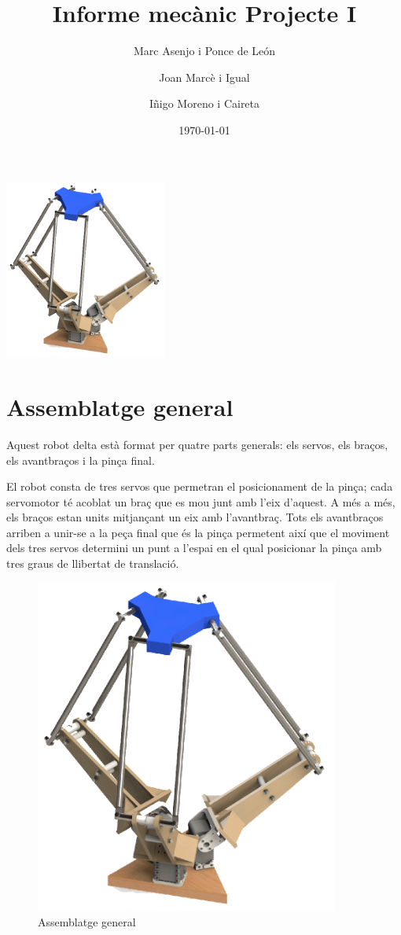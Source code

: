 \documentclass[a4paper, 12pt]{article}
\begin{document}
\title{Informe mecànic Projecte I}
\author{Marc Asenjo i Ponce de León \and
		Joan Marcè i Igual \and
		Iñigo Moreno i Caireta}
\date{\today}
\maketitle
\begin{center}
\includegraphics[width=0.4\textwidth]{./imgComp/logo}
\end{center}

\newpage
\tableofcontents{}

\newpage
\section{Assemblatge general}

Aquest robot delta està format per quatre parts generals: els servos, els braços, els avantbraços i la pinça final. 

El robot consta de tres servos que permetran el posicionament de la pinça; cada servomotor té acoblat un braç que es mou junt amb l'eix d'aquest. A més a més, els
braços estan units mitjançant un eix amb l'avantbraç. Tots els avantbraços arriben a unir-se a la peça final que és la pinça permetent així que el moviment dels tres servos determini un punt a l'espai en el qual posicionar la pinça amb tres graus de llibertat de translació.

\begin{figure}[h!]
\centering
\includegraphics[width=10cm]{./imgComp/general}
\caption{Assemblatge general}
\end{figure}
\end{document}
